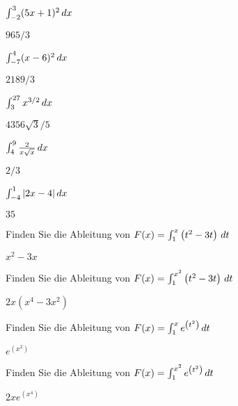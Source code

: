\begin{exercises}
\begin{exercise} $\int_{-2}^3 (5x+1)^2\, d x$
\begin{answer} $965/3$
\end{answer}\end{exercise}

\begin{exercise} $\int_{-7}^4(x-6)^2 \, d x$
\begin{answer} $2189/3$
\end{answer}\end{exercise}

\begin{exercise} $\int_3^{27}x^{3/2}\, d x$
\begin{answer} $4356 \sqrt{3}/5$
\end{answer}\end{exercise}

\begin{exercise} $\int_4^9\frac{2}{x\sqrt x}\, d x$
\begin{answer} $2/3$
\end{answer}\end{exercise}

\begin{exercise} $\int_{-4}^1|2x-4|\, d x$
\begin{answer} $35$
\end{answer}\end{exercise}

\endtwocol

\begin{exercise} Finden Sie die Ableitung von $F(x)=\int_1^x \left(t^2-3t\right)\, d t$
\begin{answer} $x^2-3x$
\end{answer}\end{exercise}

\begin{exercise} Finden Sie die Ableitung von $F(x)=\int_1^{x^2} \left(t^2-3t\right)\, d t$
\begin{answer} $2x(x^4-3x^2)$
\end{answer}\end{exercise}

\begin{exercise} Finden Sie die Ableitung von $F(x)=\int_1^x e^{\left(t^2\right)}\, d t$
\begin{answer} $e^{\left(x^2\right)}$
\end{answer}\end{exercise}

\begin{exercise} Finden Sie die Ableitung von $F(x)=\int_1^{x^2} e^{\left(t^2\right)}\, d t$
\begin{answer} $2xe^{\left(x^4\right)}$
\end{answer}\end{exercise}



\end{exercises}
